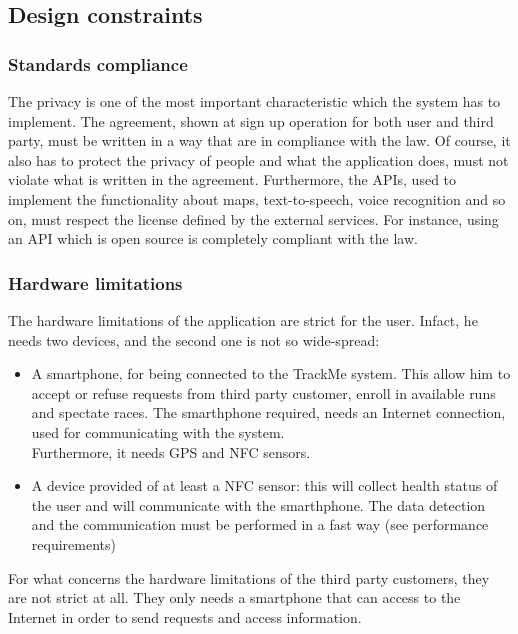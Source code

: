 \subsection{Design constraints}
\subsubsection{Standards compliance}
The privacy is one of the most important characteristic which the system has to implement. The agreement, shown at sign up operation for both user and third party, must be written in a way that are in compliance with the law. Of course, it also has to protect the privacy of people and what the application does, must not violate what is written in the agreement. Furthermore, the APIs, used to implement the functionality about maps, text-to-speech, voice recognition and so on, must respect the license defined by the external services. For instance, using an API which is open source is completely compliant with the law. 

\subsubsection{Hardware limitations}
The hardware limitations of the application are strict for the user. Infact, he needs two devices, and the second one is not so wide-spread:
\begin{itemize}
\item A smartphone, for being connected to the TrackMe system. This allow him to accept or refuse requests from third party customer, enroll in available runs and spectate races. The smarthphone required, needs an Internet connection, used for communicating with the system. \\ 
Furthermore, it needs GPS and NFC sensors.  
\item A device provided of at least a NFC sensor: this will collect health status of the user and will communicate with the smarthphone. The data detection and the communication must be performed in a fast way (see performance requirements)
\end{itemize}

For what concerns the hardware limitations of the third party customers, they are not strict at all. They only needs a smartphone that can access to the Internet in order to send requests and access information.

